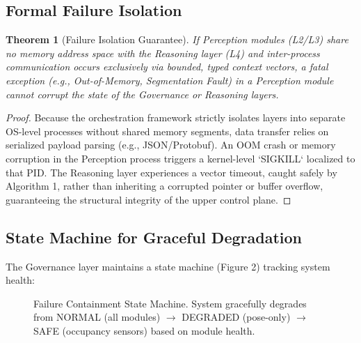 \documentclass[conference]{IEEEtran}
\newtheorem{theorem}{Theorem}
\begin{document}
\subsection{Formal Failure Isolation}
\begin{theorem}[Failure Isolation Guarantee]
If Perception modules (L2/L3) share no memory address space with the Reasoning layer (L4) and inter-process communication occurs exclusively via bounded, typed context vectors, a fatal exception (e.g., Out-of-Memory, Segmentation Fault) in a Perception module cannot corrupt the state of the Governance or Reasoning layers.
\end{theorem}

\begin{proof}
Because the orchestration framework strictly isolates layers into separate OS-level processes without shared memory segments, data transfer relies on serialized payload parsing (e.g., JSON/Protobuf). An OOM crash or memory corruption in the Perception process triggers a kernel-level `SIGKILL` localized to that PID. The Reasoning layer experiences a vector timeout, caught safely by Algorithm 1, rather than inheriting a corrupted pointer or buffer overflow, guaranteeing the structural integrity of the upper control plane.
\end{proof}

\subsection{State Machine for Graceful Degradation}
The Governance layer maintains a state machine (Figure 2) tracking system health:



\begin{figure}[htbp]
\centering
{}
\caption{Failure Containment State Machine. System gracefully degrades from NORMAL (all modules) $\to$ DEGRADED (pose-only) $\to$ SAFE (occupancy sensors) based on module health.}
\label{fig:fsm}
\end{figure}
\end{document}
